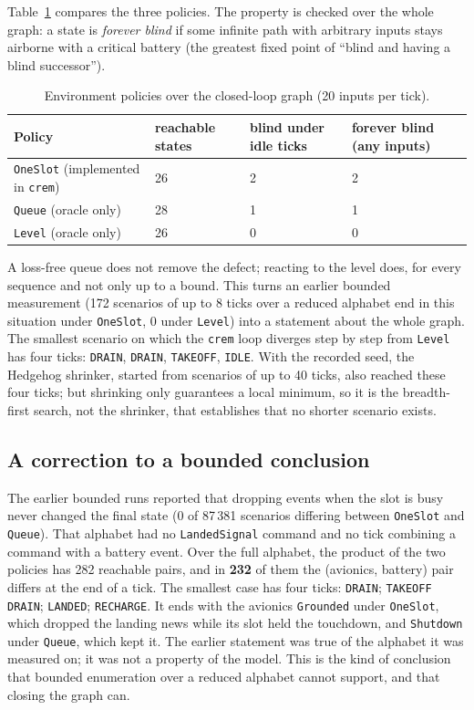\documentclass[review]{jfp-epi}
\newcommand{\crem}{\texttt{crem}}
\newcommand{\code}[1]{\texttt{#1}}
\begin{document}
Table~\ref{tab:policies} compares the three policies. The property is checked over the whole graph: a state is \emph{forever blind} if some infinite path with arbitrary inputs stays airborne with a critical battery (the greatest fixed point of ``blind and having a blind successor'').

\begin{table}[t]
\caption{Environment policies over the closed-loop graph (20 inputs per tick).}
\label{tab:policies}
\small
\begin{tabular}{@{}lp{1.9cm}p{2.4cm}p{2.9cm}@{}}
\toprule
Policy & reachable states & blind under idle ticks & forever blind (any inputs) \\
\midrule
\code{OneSlot} (implemented in \crem{}) & 26 & 2 & 2 \\
\code{Queue} (oracle only) & 28 & 1 & 1 \\
\code{Level} (oracle only) & 26 & 0 & 0 \\
\bottomrule
\end{tabular}
\end{table}

A loss-free queue does not remove the defect; reacting to the level does, for every sequence and not only up to a bound. This turns an earlier bounded measurement (172 scenarios of up to 8 ticks over a reduced alphabet end in this situation under \code{OneSlot}, 0 under \code{Level}) into a statement about the whole graph. The smallest scenario on which the \crem{} loop diverges step by step from \code{Level} has four ticks: \code{DRAIN}, \code{DRAIN}, \code{TAKEOFF}, \code{IDLE}. With the recorded seed, the Hedgehog shrinker, started from scenarios of up to 40 ticks, also reached these four ticks; but shrinking only guarantees a local minimum, so it is the breadth-first search, not the shrinker, that establishes that no shorter scenario exists.

\subsection{A correction to a bounded conclusion}

The earlier bounded runs reported that dropping events when the slot is busy never changed the final state (0 of 87\,381 scenarios differing between \code{OneSlot} and \code{Queue}). That alphabet had no \code{LandedSignal} command and no tick combining a command with a battery event. Over the full alphabet, the product of the two policies has 282 reachable pairs, and in \textbf{232} of them the (avionics, battery) pair differs at the end of a tick. The smallest case has four ticks: \code{DRAIN}; \code{TAKEOFF DRAIN}; \code{LANDED}; \code{RECHARGE}. It ends with the avionics \code{Grounded} under \code{OneSlot}, which dropped the landing news while its slot held the touchdown, and \code{Shutdown} under \code{Queue}, which kept it. The earlier statement was true of the alphabet it was measured on; it was not a property of the model. This is the kind of conclusion that bounded enumeration over a reduced alphabet cannot support, and that closing the graph can.
\end{document}
